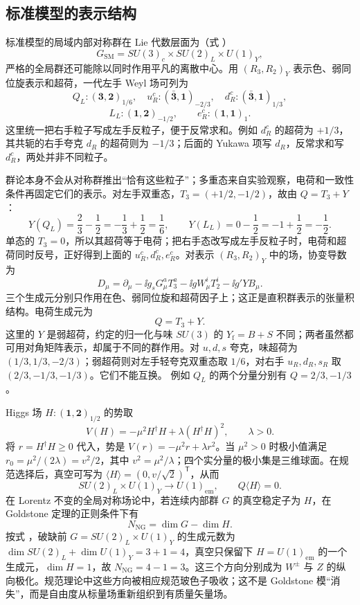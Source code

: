 \subsection{标准模型的表示结构}

标准模型的局域内部对称群在 Lie 代数层面为（式 ）
\begin{equation}
G_{\mathrm{SM}}=SU(3)_c\times SU(2)_L\times U(1)_Y,
\label{eq:standard-model-group}
\end{equation}
严格的全局群还可能除以同时作用平凡的离散中心。用 $(R_3,R_2)_Y$ 表示色、弱同位旋表示和超荷，一代左手 Weyl 场可列为
\[
Q_L:(\mathbf3,\mathbf2)_{1/6},\quad
u_R^c:(\bar{\mathbf3},\mathbf1)_{-2/3},\quad
d_R^c:(\bar{\mathbf3},\mathbf1)_{1/3},
\]
\[
L_L:(\mathbf1,\mathbf2)_{-1/2},\qquad
e_R^c:(\mathbf1,\mathbf1)_1 .
\]
这里统一把右手粒子写成左手反粒子，便于反常求和。例如 $d_R^c$ 的超荷为 $+1/3$，其共轭的右手夸克 $d_R$ 的超荷则为 $-1/3$；后面的 Yukawa 项写 $d_R$，反常求和写 $d_R^c$，两处并非不同粒子。

群论本身不会从对称群推出“恰有这些粒子”；多重态来自实验观察，电荷和一致性条件再固定它们的表示。对左手双重态，$T_3=(+1/2,-1/2)$，故由 $Q=T_3+Y$：
\[
Y(Q_L)=\frac23-\frac12=-\frac13+\frac12=\frac16,\qquad
Y(L_L)=0-\frac12=-1+\frac12=-\frac12.
\]
单态的 $T_3=0$，所以其超荷等于电荷；把右手态改写成左手反粒子时，电荷和超荷同时反号，正好得到上面的 $u_R^c,d_R^c,e_R^c$。对表示 $(R_3,R_2)_Y$ 中的场，协变导数为
\[
D_\mu=\partial_\mu-\ii g_s G_\mu^a T_3^a-\ii g W_\mu^i T_2^i-\ii g'YB_\mu .
\]
三个生成元分别只作用在色、弱同位旋和超荷因子上；这正是直积群表示的张量积结构。电荷生成元为
\begin{equation}
Q=T_3+Y.
\label{eq:gell-mann-nishijima}
\end{equation}
这里的 $Y$ 是弱超荷，约定的归一化与味 $SU(3)$ 的 $Y_{\mathrm f}=B+S$ 不同；两者虽然都可用对角矩阵表示，却属于不同的群作用。对 $u,d,s$ 夸克，味超荷为 $(1/3,1/3,-2/3)$；弱超荷则对左手轻夸克双重态取 $1/6$，对右手 $u_R,d_R,s_R$ 取 $(2/3,-1/3,-1/3)$。它们不能互换。
例如 $Q_L$ 的两个分量分别有 $Q=2/3,-1/3$。

Higgs 场 $H:(\mathbf1,\mathbf2)_{1/2}$ 的势取
\[
V(H)=-\mu^2H^\dagger H+\lambda(H^\dagger H)^2,
\qquad \lambda>0.
\]
将 $r=H^\dagger H\ge0$ 代入，势是 $V(r)=-\mu^2r+\lambda r^2$。当 $\mu^2>0$ 时极小值满足 $r_0=\mu^2/(2\lambda)=v^2/2$，其中 $v^2=\mu^2/\lambda$；四个实分量的极小集是三维球面。在规范选择后，真空可写为 $\langle H\rangle=(0,v/\sqrt2)^{\mathsf T}$，从而
\[
SU(2)_L\times U(1)_Y\longrightarrow U(1)_{\mathrm{em}},
\qquad Q\langle H\rangle=0.
\]
在 Lorentz 不变的全局对称场论中，若连续内部群 $G$ 的真空稳定子为 $H$，在 Goldstone 定理的正则条件下有
\begin{equation}
N_{\mathrm{NG}}=\dim G-\dim H.
\label{eq:goldstone-counting}
\end{equation}
按式 ，破缺前 $G=SU(2)_L\times U(1)_Y$ 的生成元数为 $\dim SU(2)_L+\dim U(1)_Y=3+1=4$，真空只保留下 $H=U(1)_{\mathrm{em}}$ 的一个生成元，$\dim H=1$，故 $N_{\mathrm{NG}}=4-1=3$。这三个方向分别成为 $W^\pm$ 与 $Z$ 的纵向极化。规范理论中这些方向被相应规范玻色子吸收；这不是 Goldstone 模“消失”，而是自由度从标量场重新组织到有质量矢量场。

